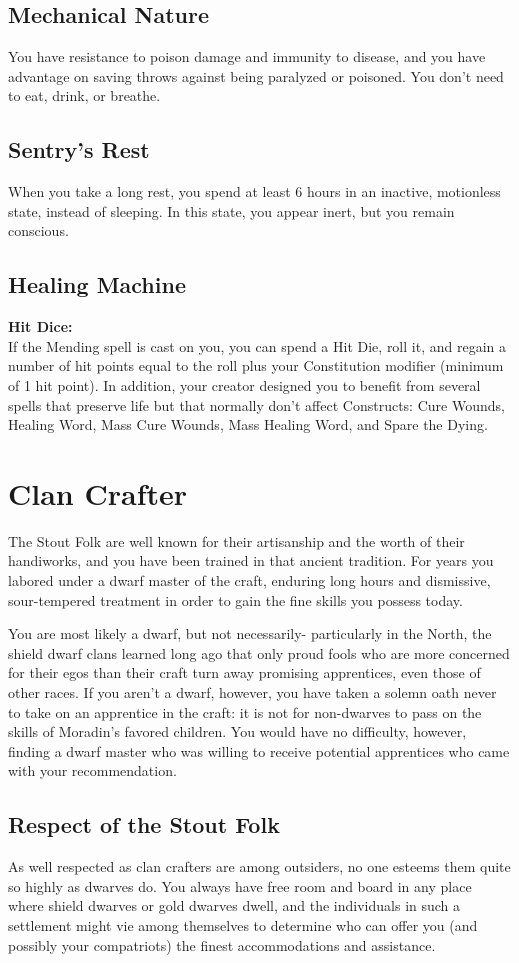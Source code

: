\documentclass[letterpaper,openany,oneside,twocolumn]{book}
\begin{document}
\subsection*{Mechanical Nature}
You have resistance to poison damage and immunity to disease, and you have advantage on saving throws against being paralyzed or poisoned. You don't need to eat, drink, or breathe.
\subsection*{Sentry's Rest}
When you take a long rest, you spend at least 6 hours in an inactive, motionless state, instead of sleeping. In this state, you appear inert, but you remain conscious.
\subsection*{Healing Machine}
\textbf{Hit Dice: \HitDiceValue}\\
If the Mending spell is cast on you, you can spend a Hit Die, roll it, and regain a number of hit points equal to the roll plus your Constitution modifier (minimum of 1 hit point). In addition, your creator designed you to benefit from several spells that preserve life but that normally don't affect Constructs: Cure Wounds, Healing Word, Mass Cure Wounds, Mass Healing Word, and Spare the Dying.

\section*{Clan Crafter}
The Stout Folk are well known for their artisanship and the worth of their handiworks, and you have been trained in that ancient tradition. For years you labored under a dwarf master of the craft, enduring long hours and dismissive, sour-tempered treatment in order to gain the fine skills you possess today.

You are most likely a dwarf, but not necessarily- particularly in the North, the shield dwarf clans learned long ago that only proud fools who are more concerned for their egos than their craft turn away promising apprentices, even those of other races. If you aren't a dwarf, however, you have taken a solemn oath never to take on an apprentice in the craft: it is not for non-dwarves to pass on the skills of Moradin's favored children. You would have no difficulty, however, finding a dwarf master who was willing to receive potential apprentices who came with your recommendation.
\subsection*{Respect of the Stout Folk}
As well respected as clan crafters are among outsiders, no one esteems them quite so highly as dwarves do. You always have free room and board in any place where shield dwarves or gold dwarves dwell, and the individuals in such a settlement might vie among themselves to determine who can offer you (and possibly your compatriots) the finest accommodations and assistance.
\vfill\eject
\end{document}
